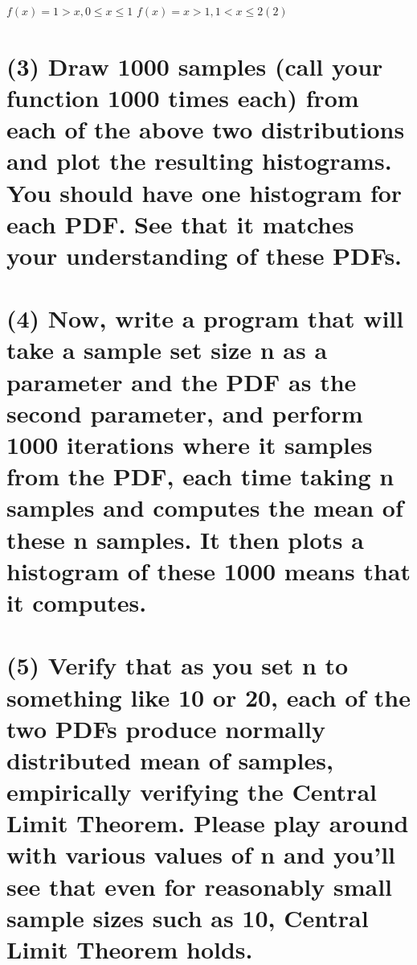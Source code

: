 \documentclass[]{article}
\begin{document}
\(f(x) = 1 > x, 0 \leq x \leq 1\) \(f(x) = x > 1, 1 < x \leq 2 (2)\)

\section{(3) Draw 1000 samples (call your function 1000 times each) from
each of the above two distributions and plot the resulting histograms.
You should have one histogram for each PDF. See that it matches your
understanding of these
PDFs.}\label{draw-1000-samples-call-your-function-1000-times-each-from-each-of-the-above-two-distributions-and-plot-the-resulting-histograms.-you-should-have-one-histogram-for-each-pdf.-see-that-it-matches-your-understanding-of-these-pdfs.}

\section{(4) Now, write a program that will take a sample set size n as
a parameter and the PDF as the second parameter, and perform 1000
iterations where it samples from the PDF, each time taking n samples and
computes the mean of these n samples. It then plots a histogram of these
1000 means that it
computes.}\label{now-write-a-program-that-will-take-a-sample-set-size-n-as-a-parameter-and-the-pdf-as-the-second-parameter-and-perform-1000-iterations-where-it-samples-from-the-pdf-each-time-taking-n-samples-and-computes-the-mean-of-these-n-samples.-it-then-plots-a-histogram-of-these-1000-means-that-it-computes.}

\section{(5) Verify that as you set n to something like 10 or 20, each
of the two PDFs produce normally distributed mean of samples,
empirically verifying the Central Limit Theorem. Please play around with
various values of n and you'll see that even for reasonably small sample
sizes such as 10, Central Limit Theorem
holds.}\label{verify-that-as-you-set-n-to-something-like-10-or-20-each-of-the-two-pdfs-produce-normally-distributed-mean-of-samples-empirically-verifying-the-central-limit-theorem.-please-play-around-with-various-values-of-n-and-youll-see-that-even-for-reasonably-small-sample-sizes-such-as-10-central-limit-theorem-holds.}
\end{document}
